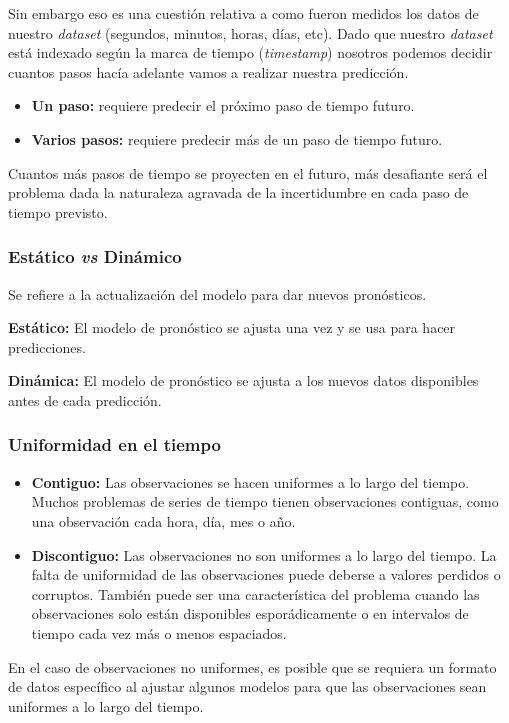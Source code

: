 \documentclass[a4paper,12pt]{article}
\begin{document}
Sin embargo eso es una cuestión relativa a como fueron medidos los datos de nuestro \textit{dataset} (segundos, minutos, horas, días, etc). Dado que nuestro \textit{dataset} está indexado según la marca de tiempo (\textit{timestamp}) nosotros podemos decidir cuantos pasos hacía adelante vamos a realizar nuestra predicción.

\begin{itemize}
	\item \textbf{Un paso:} requiere predecir el próximo paso de tiempo futuro.
	\item \textbf{Varios pasos:} requiere predecir más de un paso de tiempo futuro.
\end{itemize}

Cuantos más pasos de tiempo se proyecten en el futuro, más desafiante será el problema dada la naturaleza agravada de la incertidumbre en cada paso de tiempo previsto.

\subsubsection{Estático \textit{vs} Dinámico}
Se refiere a la actualización del modelo para dar nuevos pronósticos.

\textbf{Estático:} El modelo de pronóstico se ajusta una vez y se usa para hacer predicciones.

\textbf{Dinámica:} El modelo de pronóstico se ajusta a los nuevos datos disponibles antes de cada predicción.

\subsubsection{Uniformidad en el tiempo}

\begin{itemize}
	\item \textbf{Contiguo:} Las observaciones se hacen uniformes a lo largo del tiempo. Muchos problemas de series de tiempo tienen observaciones contiguas, como una observación cada hora, día, mes o año.
	\item \textbf{Discontiguo:} Las observaciones no son uniformes a lo largo del tiempo. La falta de uniformidad de las observaciones puede deberse a valores perdidos o corruptos. También puede ser una característica del problema cuando las observaciones solo están disponibles esporádicamente o en intervalos de tiempo cada vez más o menos espaciados.
\end{itemize}

En el caso de observaciones no uniformes, es posible que se requiera un formato de datos específico al ajustar algunos modelos para que las observaciones sean uniformes a lo largo del tiempo.
\end{document}

